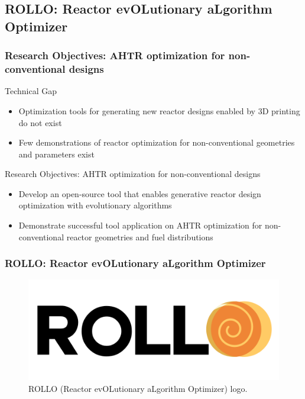 \subsection{ROLLO: Reactor evOLutionary aLgorithm Optimizer}

\begin{frame}
    \frametitle{Research Objectives: AHTR optimization for non-conventional designs}
    \begin{block}{Technical Gap}
      \begin{itemize}
        \item Optimization tools for generating new reactor designs enabled by
        3D printing do not exist
        \item Few demonstrations of reactor optimization for non-conventional 
        geometries and parameters exist
      \end{itemize}
    \end{block}
    \begin{block}{Research Objectives: AHTR optimization for non-conventional designs}
        \begin{itemize}
            \item Develop an open-source tool that enables generative reactor design 
            optimization with evolutionary algorithms 
            \item Demonstrate successful tool application on AHTR optimization for 
            non-conventional reactor geometries and fuel distributions
        \end{itemize}
    \end{block}
  \end{frame}

\begin{frame}
    \frametitle{ROLLO: Reactor evOLutionary aLgorithm Optimizer}
    \begin{figure}
        \includegraphics[width=0.7\linewidth]{figures/rollo-logo.png} 
        \caption{ROLLO (Reactor evOLutionary aLgorithm Optimizer) logo.}
    \end{figure}
    \begin{itemize}
    \end{itemize}
\end{frame}

